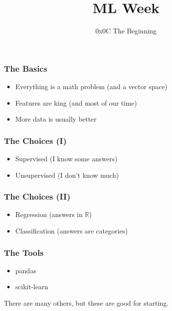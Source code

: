 
\title
{ML Week}
\subtitle{0x0C \hspace{2mm}  The Beginning}




\begin{frame}
  \titlepage
\end{frame}


\begin{frame}
  \frametitle{The Basics}

  \begin{itemize}
  \item Everything is a math problem (and a vector space)
  \item Features are king (and most of our time)
  \item More data is usually better
  \end{itemize}
\end{frame}

\begin{frame}
  \frametitle{The Choices (I)}
    
  \begin{itemize}
  \item Supervised (I know some answers)
  \item Unsupervised (I don't know much)
  \end{itemize}
\end{frame}

\begin{frame}
  \frametitle{The Choices (II)}
  \begin{itemize}
  \item Regression (answers in $\mathbb{R}$)
  \item Classification (answers are categories)
  \end{itemize}
\end{frame}

\begin{frame}
  \frametitle{The Tools}

  \begin{itemize}
  \item pandas
  \item scikit-learn
  \end{itemize}

  There are many others, but these are good for starting.\\
\end{frame}


